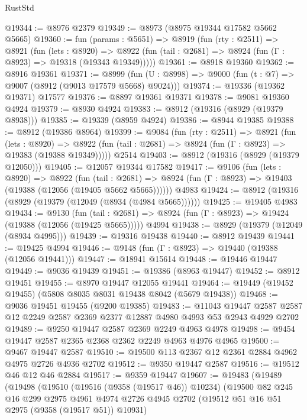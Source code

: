 \begin{lexlean}{RustStd}
\begin{coremodule}
@19344 := @8976 @2379
@19349 := @8973 (@8975 @19344 @17582 @5662 @5665)
@19360 := fun (params : @5651) =>
  @8919
    (fun (rty : @2511) =>
    @8921
      (fun (lets : @8920) =>
      @8922 (fun (tail : @2681) => @8924 (fun (Γ : @8923) => @19318 (@19343 @19349)))))
@19361 := @8918 @19360
@19362 := @8916 @19361
@19371 := @8999
    (fun (U : @8998) => @9000 (fun (t : @7) => @9007 (@8912 (@9013 @17579 @5668) @9024)))
@19374 := @19336 (@19362 @19371) @17577
@19376 := @8897 @19361 @19371
@19378 := @9081 @19360 @4924
@19379 := @8930 @4924
@19383 := @8912 (@19316 (@8929 (@19379 @8938)))
@19385 := @19339 (@8959 @4924)
@19386 := @8944 @19385
@19388 := @8912 (@19386 @8964)
@19399 := @9084
    (fun (rty : @2511) =>
    @8921
      (fun (lets : @8920) =>
      @8922 (fun (tail : @2681) => @8924 (fun (Γ : @8923) => @19383 (@19388 @19349)))))
    @2514
@19403 := @8912 (@19316 (@8929 (@19379 @12050)))
@19405 := @12057 @19344 @17582
@19417 := @9106
    (fun (lets : @8920) =>
    @8922
      (fun (tail : @2681) =>
      @8924 (fun (Γ : @8923) => @19403 (@19388 (@12056 (@19405 @5662 @5665))))))
    @4983
@19424 := @8912 (@19316 (@8929 (@19379 (@12049 (@8934 (@4984 @5665))))))
@19425 := @19405 @4983
@19434 := @9130
    (fun (tail : @2681) => @8924 (fun (Γ : @8923) => @19424 (@19388 (@12056 (@19425 @5665)))))
    @4994
@19438 := @8929 (@19379 (@12049 (@8934 @4995)))
@19439 := @19316 @19438
@19440 := @8912 @19439
@19441 := @19425 @4994
@19446 := @9148 (fun (Γ : @8923) => @19440 (@19388 (@12056 @19441)))
@19447 := @18941 @15614
@19448 := @19446 @19447
@19449 := @9036 @19439
@19451 := @19386 (@8963 @19447)
@19452 := @8912 @19451
@19455 := @8970 @19447 @12055 @19441
@19464 := @19449 (@19452 @19455) (@5808 @8035 @8031 @19438 @8042 (@5679 @19438))
@19468 := @9036 @19451 @19455 (@9200 @19385)
@19483 := @11043
    @19447
    @2587
    @2587
    @12
    @2249
    @2587
    @2369
    @2377
    @12887
    @4980
    @4993
    @53
    @2943
    @4929
    @2702
@19489 := @9250 @19447 @2587 @2369 @2249 @4963 @4978
@19498 := @9454 @19447 @2587 @2365 @2368 @2362 @2249 @4963 @4976 @4965
@19500 := @9467 @19447 @2587
@19510 := @19500 @113 @2367 @12 @2361 @2884 @4962 @4975 @2726 @4936 @2702
@19512 := @9350 @19447 @2587
@19516 := @19512 @46 @12 @46 @2884
@19517 := @9359 @19447
@19607 := @19483
    (@19489
      (@19498
        (@19510
          (@19516 (@9358 (@19517 @46)) @10234)
          (@19500
            @82
            @245
            @16
            @299
            @2975
            @4961
            @4974
            @2726
            @4945
            @2702
            (@19512 @51 @16 @51 @2975 (@9358 (@19517 @51)) @10931)

\end{coremodule}
\end{lexlean}
